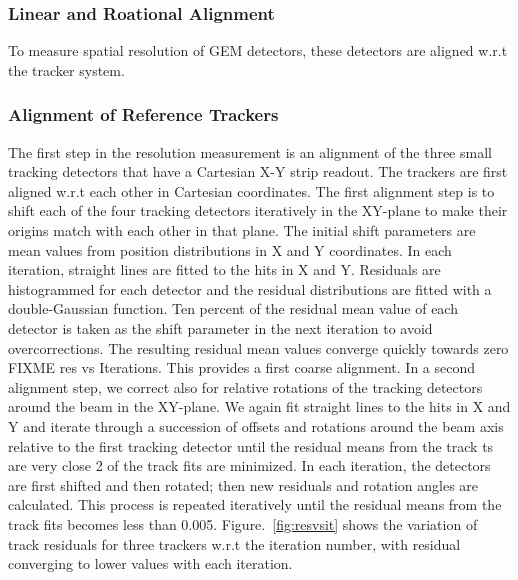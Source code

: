  
\subsubsection{Linear and Roational Alignment}

 To measure spatial resolution of GEM detectors, these detectors are aligned w.r.t the tracker system.
\subsubsection{Alignment of Reference Trackers}
The first step in the resolution measurement is an alignment of the three small tracking detectors that have a Cartesian X-Y strip readout. The trackers are first aligned w.r.t each other in Cartesian coordinates. The first alignment step is to shift each of the four tracking detectors iteratively in the XY-plane to make their origins match with each other in that plane. The initial shift parameters are mean values from position distributions in X and Y coordinates. In each iteration, straight lines are fitted to the hits in X and Y. Residuals are histogrammed for each detector and the residual distributions are fitted with a double-Gaussian function. Ten percent of the residual mean value of each detector is taken as the shift parameter in the next iteration to avoid overcorrections. The resulting residual mean values converge quickly towards zero FIXME res vs Iterations. This provides a first coarse alignment. In a second alignment step, we correct also for relative rotations of the tracking detectors around the beam in the XY-plane. We again fit straight lines to the hits in X and Y and iterate through a succession of offsets and rotations around the beam axis relative to the first tracking detector until the residual means from the track ts are very close 2 of the track fits are minimized. In each iteration, the detectors are first shifted and then rotated; then new residuals and rotation angles are calculated. This process is repeated iteratively until the residual means from the track fits becomes less than 0.005. Figure.~\ref{fig:resvsit} shows the variation of track residuals for three trackers w.r.t the iteration number, with residual converging to lower values with each iteration.
